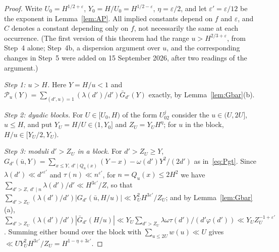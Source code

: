 \documentclass[11pt,a4paper]{article}
\theoremstyle{remark}\newtheorem{remark}[theorem]{Remark}
\begin{document}
\begin{proof}
Write $U_0=H^{1/2+\varepsilon}$, $Y_0=H/U_0=H^{1/2-\varepsilon}$, $\eta=\varepsilon/2$, and let $\varepsilon'=\varepsilon/12$ be the
exponent in Lemma~\ref{lem:AP}. All implied constants depend on $f$ and $\varepsilon$, and $C$ denotes a constant depending
only on $f$, not necessarily the same at each occurrence. (The first version of this theorem had the range $u>H^{2/3+\varepsilon}$,
from Step~4 alone; Step~4b, a dispersion argument over $u$, and the corresponding changes in Step~5 were added on 15 September
2026, after two readings of the argument.)

\emph{Step 1: $u>H$.} Here $Y=H/u<1$ and $\mathcal P_u(Y)=\sum_{(d',u)=1}(\lambda(d')/d')\bar G_{d'}(Y)$ exactly, by
Lemma~\ref{lem:Gbar}(b).

\emph{Step 2: dyadic blocks.} For $U\in[U_0,H)$ of the form $U_02^j$ consider the $u\in(U,2U]$, $u\le H$, and put
$Y_U=H/U\in(1,Y_0]$ and $Z_U=Y_UH^{\eta}$; for $u$ in the block, $H/u\in[Y_U/2,Y_U)$.

\emph{Step 3: moduli $d'>Z_U$ in a block.} For $d'>Z_U\ge Y$, $G_{d'}(\bar u,Y)=\sum_{x\le Y,\ d'\mid Q_u(x)}(Y-x)-\omega(d')Y^2/(2d')$
as in~\eqref{eq:Pgt}. Since $\lambda(d')\ll d'^{\varepsilon'}$ and $\tau(n)\ll n^{\varepsilon'}$, for $n=Q_u(x)\le2H^2$ we have
$\sum_{d'>Z,\ d'\mid n}\lambda(d')/d'\ll H^{3\varepsilon'}/Z$, so that
$\sum_{d'>Z_U}(\lambda(d')/d')|G_{d'}(\bar u,H/u)|\ll Y_U^2H^{3\varepsilon'}/Z_U$; and by Lemma~\ref{lem:Gbar}(a),
$\sum_{d'>Z_U}(\lambda(d')/d')|\bar G_{d'}(H/u)|\ll Y_U\sum_{d'>Z_U}\lambda\omega\tau(d')/(d'\varphi(d'))\ll Y_UZ_U^{-1+\varepsilon'}$.
Summing either bound over the block with $\sum_{u\le2U}w(u)\ll U$ gives $\ll UY_U^2H^{3\varepsilon'}/Z_U=H^{1-\eta+3\varepsilon'}$.


\end{proof}
\end{document}
